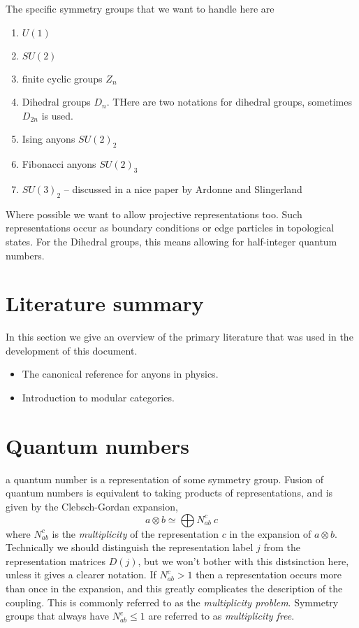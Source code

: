 \documentclass[12pt]{article}
\begin{document}
The specific symmetry groups that we want to handle here are
\begin{enumerate}
\item $U(1)$
\item $SU(2)$
\item finite cyclic groups $Z_n$
\item Dihedral groups $D_n$. THere are two notations for dihedral groups, sometimes $D_{2n}$ is used.
\item Ising anyons $SU(2)_2$
\item Fibonacci anyons $SU(2)_3$
\item $SU(3)_2$ -- discussed in a nice paper by Ardonne and Slingerland\cite{Ardonne}
\end{enumerate}
Where possible we want to allow projective representations too. Such representations occur
as boundary conditions or edge particles in topological states. For the Dihedral
groups, this means allowing for half-integer quantum numbers.

\section{Literature summary}

In this section we give an overview of the primary literature that was used in the development of this document.

\begin{itemize}
\item \cite{Bonderson} The canonical reference for anyons in physics. 
\item \cite{MTC} Introduction to modular categories.
\end{itemize}

\section{Quantum numbers}

a quantum number is a representation of some symmetry group. Fusion of quantum
numbers is equivalent to taking products of representations, and is given by
the Clebsch-Gordan expansion,
\begin{equation}
a \otimes b \simeq \bigoplus N^{c}_{ab} \: c
\end{equation}
where $N^{c}_{ab}$ is the \emph{multiplicity} of the representation $c$ in the expansion
of $a \otimes b$.
Technically we should distinguish the representation label $j$ from the representation
matrices $D(j)$, but we won't bother with this distsinction here, unless it gives a clearer
notation.
If $N^{c}_{ab} > 1$ then a representation occurs more than once in the expansion,
and this greatly complicates the description of the coupling. This is commonly
referred to as the \emph{multiplicity problem}. Symmetry groups that always have 
$N^{c}_{ab} \leq 1$ are referred to as \emph{multiplicity free}.
\end{document}
